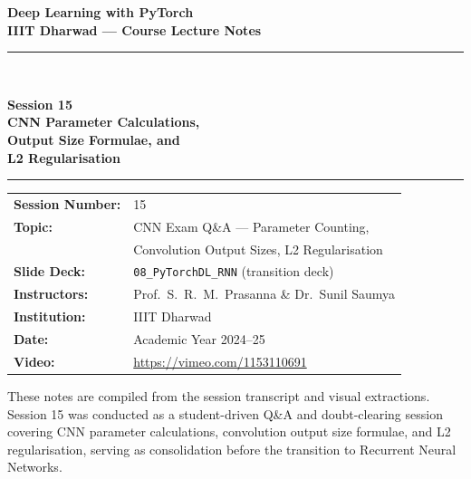 \documentclass[12pt,a4paper]{article}
\begin{document}
\begin{titlepage}
  \centering
  \vspace*{2cm}
  {\LARGE\bfseries Deep Learning with PyTorch\\[0.4em]
   \large IIIT Dharwad --- Course Lecture Notes\par}
  \vspace{1.5cm}
  \rule{\linewidth}{0.5pt}\\[0.4em]
  {\huge\bfseries Session 15\\[0.3em]
   \Large CNN Parameter Calculations,\\
   Output Size Formulae, and\\
   L2 Regularisation\par}
  \rule{\linewidth}{0.5pt}
  \vspace{1.5cm}
  \begin{tabular}{ll}
    \textbf{Session Number:} & 15 \\[4pt]
    \textbf{Topic:}          & CNN Exam Q\&A --- Parameter Counting, \\
                             & Convolution Output Sizes, L2 Regularisation \\[4pt]
    \textbf{Slide Deck:}     & \texttt{08\_PyTorchDL\_RNN} (transition deck) \\[4pt]
    \textbf{Instructors:}    & Prof.\ S.~R.~M.\ Prasanna \&
                               Dr.\ Sunil Saumya \\[4pt]
    \textbf{Institution:}    & IIIT Dharwad \\[4pt]
    \textbf{Date:}           & Academic Year 2024--25 \\[4pt]
    \textbf{Video:}          & \url{https://vimeo.com/1153110691} \\
  \end{tabular}
  \vfill
  {\small These notes are compiled from the session transcript and visual
   extractions. Session 15 was conducted as a student-driven Q\&A and
   doubt-clearing session covering CNN parameter calculations, convolution
   output size formulae, and L2 regularisation, serving as consolidation
   before the transition to Recurrent Neural Networks.}
\end{titlepage}

\tableofcontents
\newpage
\end{document}
